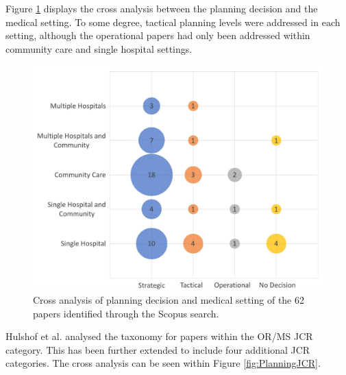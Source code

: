 \documentclass[../thesis.tex]{subfiles}
\begin{document}
Figure \ref{fig:PlanningSetting} displays the cross analysis between the planning decision and the medical setting. To some degree, tactical planning levels were addressed in each setting, although the operational papers had only been addressed within community care and single hospital settings. 

\begin{figure}[H]
\centering
        \includegraphics[scale = 0.5]{Chapter2/Figures/PlanningSetting1.pdf}
        \caption{Cross analysis of planning decision and medical setting of the 62 papers identified through the Scopus search.}
    \label{fig:PlanningSetting}
\end{figure}

Hulshof et al. \cite{PHulshof} analysed the taxonomy for papers within the OR/MS JCR category. This has been further extended to include four additional JCR categories. The cross analysis can be seen within Figure \ref{fig:PlanningJCR}.
\end{document}
